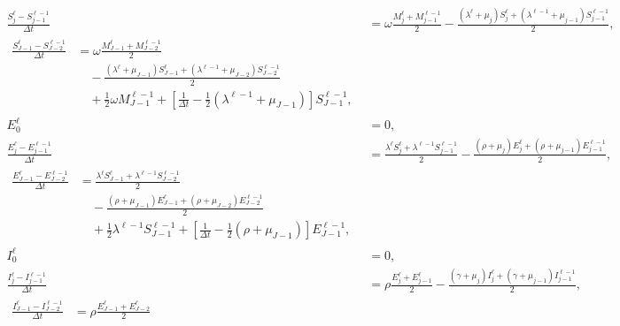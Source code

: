 \documentclass{jpmarticle}
\let\subequationsorig\subequations%
\let\endsubequationsorig\endsubequations%
\renewenvironment{subequations}{
  \subequationsorig
  \renewcommand{\theequation}{\theparentequation.\arabic{equation}}
}{
  \endsubequationsorig
}
\begin{document}
\begin{subequations}
\begin{align}
    \\
    \frac{S_j^{\ell} - S_{j - 1}^{\ell - 1}}{\Delta t} &=
    \omega \frac{M_j^{\ell} + M_{j - 1}^{\ell - 1}}{2}
    - \frac{(\lambda^{\ell} + \mu_j) S_j^{\ell}
      + (\lambda^{\ell - 1} + \mu_{j - 1}) S_{j - 1}^{\ell - 1}}{2},
    \\
    \begin{split}
      \frac{S_{J - 1}^{\ell} - S_{J - 2}^{\ell - 1}}{\Delta t} &=
      \omega \frac{M_{J - 1}^{\ell} + M_{J - 2}^{\ell - 1}}{2}
      \\ & \quad {}
      - \frac{(\lambda^{\ell} + \mu_{J - 1}) S_{J - 1}^{\ell}
        + (\lambda^{\ell - 1} + \mu_{J - 2}) S_{J - 2}^{\ell - 1}}
      {2}
      \\ & \quad {}
      + \frac{1}{2} \omega M_{J - 1}^{\ell - 1}
      + \left[\frac{1}{\Delta t}
        - \frac{1}{2} (\lambda^{\ell - 1} + \mu_{J - 1})\right]
      S_{J - 1}^{\ell - 1},
    \end{split}
    \\
    E_0^{\ell} &= 0,
    \\
    \frac{E_j^{\ell} - E_{j - 1}^{\ell - 1}}{\Delta t} &=
    \frac{\lambda^{\ell} S_j^{\ell} + \lambda^{\ell - 1} S_{j - 1}^{\ell - 1}}{2}
    - \frac{(\rho + \mu_j) E_j^{\ell}
      + (\rho + \mu_{j - 1}) E_{j - 1}^{\ell - 1}}{2},
    \\
    \begin{split}
      \frac{E_{J - 1}^{\ell} - E_{J - 2}^{\ell - 1}}{\Delta t} &=
      \frac{\lambda^{\ell} S_{J - 1}^{\ell}
        + \lambda^{\ell - 1} S_{J - 2}^{\ell - 1}}{2}
      \\ & \quad {}
      - \frac{(\rho + \mu_{J - 1}) E_{J - 1}^{\ell}
        + (\rho + \mu_{J - 2}) E_{J - 2}^{\ell - 1}}{2}
      \\ & \quad {}
      + \frac{1}{2} \lambda^{\ell - 1} S_{J - 1}^{\ell - 1}
      + \left[\frac{1}{\Delta t}
        - \frac{1}{2} (\rho + \mu_{J - 1})\right]
      E_{J - 1}^{\ell - 1},
    \end{split}
    \\
    I_0^{\ell} &= 0,
    \\
    \frac{I_j^{\ell} - I_{j - 1}^{\ell - 1}}{\Delta t} &=
    \rho \frac{E_j^{\ell} + E_{j - 1}^{\ell}}{2}
    - \frac{(\gamma + \mu_j) I_j^{\ell}
      + (\gamma + \mu_{j - 1}) I_{j - 1}^{\ell - 1}}{2},
    \\
    \begin{split}
      \frac{I_{J - 1}^{\ell} - I_{J - 2}^{\ell - 1}}{\Delta t} &=
      \rho \frac{E_{J - 1}^{\ell} + E_{J - 2}^{\ell}}{2}

\end{split}
\end{align}
\end{subequations}
\end{document}
